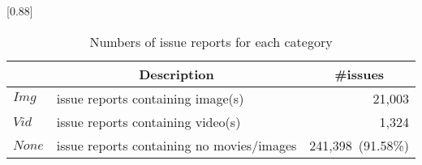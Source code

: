 
\begin{table}[t]
    \begin{center}
    \caption{Numbers of issue reports for each category}
    \scalebox{0.88}[0.88]{
    \begin{tabular}{llr}
        \toprule
         & \multicolumn{1}{c}{\textbf{Description}} & \multicolumn{1}{c}{\textbf{\#issues}} \\
        \midrule
        $Img$  & issue reports containing image(s) & 21,003\hspace{2.5mm}{\small (7.97\%)}\\%
        $Vid$  & issue reports containing video(s) & 1,324\hspace{2.5mm}{\small (0.50\%)}\\%
        $None$ & issue reports containing no movies/images & 241,398~{\small (91.58\%)}\\ 
        \bottomrule
    \end{tabular}
    }
    \label{tab:issue-category}
    \end{center}
    
\end{table}
